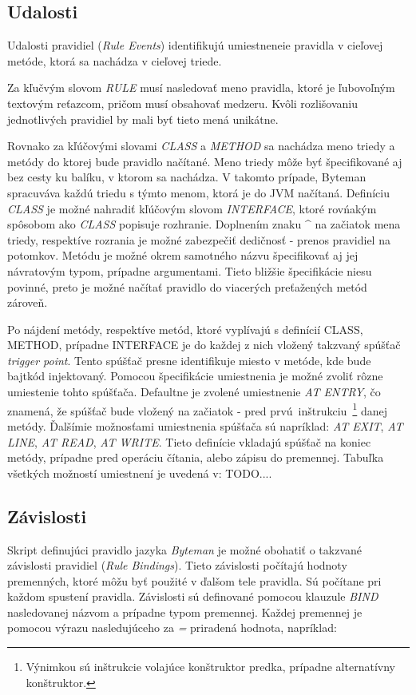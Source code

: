 \documentclass[11pt,final,oneside]{fithesis}
\begin{document}
\subsection{Udalosti}
Udalosti pravidiel (\textit{Rule Events}) identifikujú umiestneneie pravidla v
cieľovej metóde, ktorá sa nachádza v cieľovej triede.

Za kľučvým slovom \textit{RULE} musí nasledovať meno pravidla, ktoré je ľubovoľným textovým reťazcom, pričom musí obsahovať medzeru. Kvôli rozlišovaniu jednotlivých pravidiel by mali byť tieto mená unikátne.

Rovnako za kľúčovými slovami \textit{CLASS} a \textit{METHOD} sa nachádza meno triedy a metódy do ktorej bude pravidlo načítané. Meno triedy môže byť špecifikované aj bez cesty ku balíku, v ktorom sa nachádza. V takomto prípade, Byteman spracuváva každú triedu s týmto menom, ktorá je do JVM načítaná. Definíciu \textit{CLASS} je možné nahradiť kľúčovým slovom
\textit{INTERFACE}, ktoré rovńakým spôsobom ako \textit{CLASS} popisuje rozhranie. Doplnením znaku ^ na začiatok mena triedy, respektíve rozrania je možné zabezpečiť dedičnosť - prenos pravidiel na potomkov. Metódu je možné okrem samotného názvu špecifikovať aj jej návratovým typom, prípadne
argumentami. Tieto bližšie špecifikácie niesu povinné, preto je možné načítať pravidlo do viacerých preťažených metód zároveň.

Po nájdení metódy, respektíve metód, ktoré vyplívajú s definícií CLASS, METHOD, prípadne INTERFACE je do každej z nich vložený takzvaný spúšťač \textit{trigger point}. Tento spúšťač presne identifikuje miesto v metóde, kde bude bajtkód injektovaný. Pomocou špecifikácie umiestnenia je možné zvoliť rôzne umiestenie tohto spúšťača. Defaultne je zvolené umiestnenie \textit{AT ENTRY}, čo znamená, že spúšťač bude vložený na začiatok - pred prvú~inštrukciu~\footnote{Výnimkou sú inštrukcie volajúce konštruktor predka, prípadne alternatívny konštruktor.} danej metódy. Ďalšímie možnosťami umiestnenia spúšťača sú napríklad: \textit{AT EXIT}, \textit{AT LINE}, \textit{AT READ}, \textit{AT WRITE}. Tieto definície vkladajú spúšťač na koniec metódy, prípadne pred operáciu čítania, alebo zápisu do premennej. Tabuľka všetkých možností umiestnení je uvedená v: TODO....

\subsection{Závislosti}
Skript definujúci  pravidlo jazyka \textit{Byteman} je možné obohatiť o takzvané závislosti pravidiel (\textit{Rule Bindings}). Tieto závislosti počítajú hodnoty premenných, ktoré môžu byť použité v ďalšom tele pravidla. Sú počítane pri každom spustení pravidla. Závislosti sú definované pomocou klauzule \textit{BIND} nasledovanej názvom a prípadne typom premennej. Každej premennej je pomocou výrazu nasledujúceho za \textit{=} priradená hodnota, napríklad:
\end{document}
